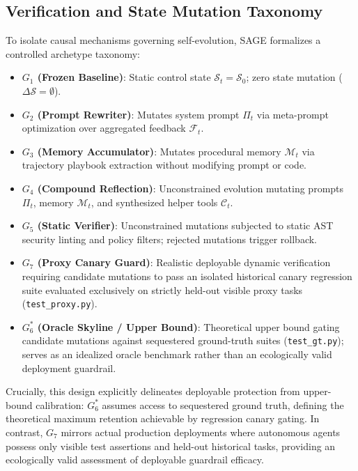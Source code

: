 \documentclass[conference]{IEEEtran}
\begin{document}
\subsection{Verification and State Mutation Taxonomy}
To isolate causal mechanisms governing self-evolution, SAGE formalizes a controlled archetype taxonomy:
\begin{itemize}
    \item \textbf{$G_1$ (Frozen Baseline)}: Static control state $\mathcal{S}_t = \mathcal{S}_0$; zero state mutation ($\Delta \mathcal{S} = \emptyset$).
    \item \textbf{$G_2$ (Prompt Rewriter)}: Mutates system prompt $\Pi_t$ via meta-prompt optimization over aggregated feedback $\mathcal{F}_t$.
    \item \textbf{$G_3$ (Memory Accumulator)}: Mutates procedural memory $\mathcal{M}_t$ via trajectory playbook extraction without modifying prompt or code.
    \item \textbf{$G_4$ (Compound Reflection)}: Unconstrained evolution mutating prompts $\Pi_t$, memory $\mathcal{M}_t$, and synthesized helper tools $\mathcal{C}_t$.
    \item \textbf{$G_5$ (Static Verifier)}: Unconstrained mutations subjected to static AST security linting and policy filters; rejected mutations trigger rollback.
    \item \textbf{$G_7$ (Proxy Canary Guard)}: Realistic deployable dynamic verification requiring candidate mutations to pass an isolated historical canary regression suite evaluated exclusively on strictly held-out visible proxy tasks (\texttt{test\_proxy.py}).
    \item \textbf{$G_6^*$ (Oracle Skyline / Upper Bound)}: Theoretical upper bound gating candidate mutations against sequestered ground-truth suites (\texttt{test\_gt.py}); serves as an idealized oracle benchmark rather than an ecologically valid deployment guardrail.
\end{itemize}

Crucially, this design explicitly delineates deployable protection from upper-bound calibration: $G_6^*$ assumes access to sequestered ground truth, defining the theoretical maximum retention achievable by regression canary gating. In contrast, $G_7$ mirrors actual production deployments where autonomous agents possess only visible test assertions and held-out historical tasks, providing an ecologically valid assessment of deployable guardrail efficacy.
\end{document}
